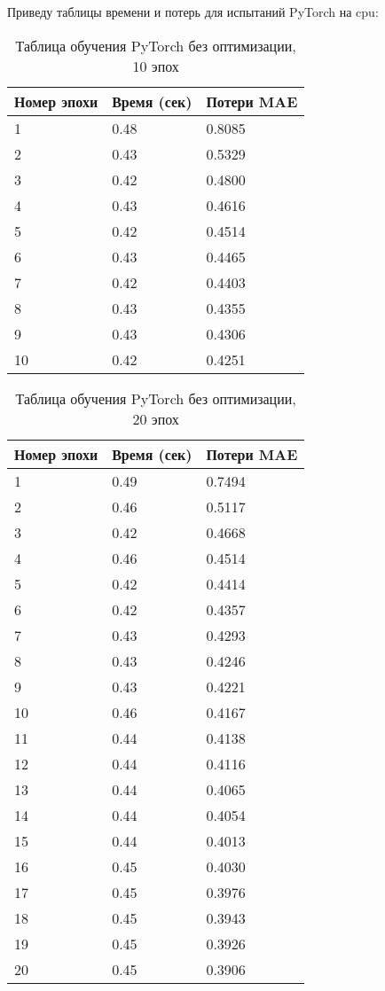 \documentclass[a4paper,12pt,titlepage,final]{article}
\begin{document}
Приведу таблицы времени и потерь для испытаний PyTorch на cpu:

\begin{table}[H]
\centering
\begin{tabular}{|p{5.4cm}|p{3.8cm}|p{3.8cm}|}
\hline
Номер эпохи & Время (сек) & Потери MAE \\
\hline
1 & 0.48 & 0.8085 \\ [1.5ex]
\hline
2 & 0.43 & 0.5329 \\ [1.5ex]
\hline
3 & 0.42 & 0.4800 \\ [1.5ex]
\hline
4 & 0.43 & 0.4616 \\ [1.5ex]
\hline
5 & 0.42 & 0.4514 \\ [1.5ex]
\hline
6 & 0.43 & 0.4465 \\ [1.5ex]
\hline
7 & 0.42 & 0.4403 \\ [1.5ex]
\hline
8 & 0.43 & 0.4355 \\ [1.5ex]
\hline
9 & 0.43 & 0.4306 \\ [1.5ex]
\hline
10 & 0.42 & 0.4251 \\ [1.5ex]
\hline
\end{tabular}
\caption{Таблица обучения PyTorch без оптимизации, 10 эпох}
\label{table7}
\end{table}

\begin{table}[H]
\centering
\begin{tabular}{|p{6.4cm}|p{3.2cm}|p{3.2cm}|}
\hline
Номер эпохи & Время (сек) & Потери MAE\\
\hline
1 & 0.49 & 0.7494 \\ [1.5ex]
\hline
2 & 0.46 & 0.5117 \\ [1.5ex]
\hline
3 & 0.42 & 0.4668 \\ [1.5ex]
\hline
4 & 0.46 & 0.4514 \\ [1.5ex]
\hline
5 & 0.42 & 0.4414 \\ [1.5ex]
\hline
6 & 0.42 & 0.4357 \\ [1.5ex]
\hline
7 & 0.43 & 0.4293 \\ [1.5ex]
\hline
8 & 0.43 & 0.4246 \\ [1.5ex]
\hline
9 & 0.43 & 0.4221 \\ [1.5ex]
\hline
10 & 0.46 & 0.4167 \\ [1.5ex]
\hline
11 & 0.44 & 0.4138 \\ [1.5ex]
\hline
12 & 0.44 & 0.4116 \\ [1.5ex]
\hline
13 & 0.44 & 0.4065 \\ [1.5ex]
\hline
14 & 0.44 & 0.4054 \\ [1.5ex]
\hline
15 & 0.44 & 0.4013 \\ [1.5ex]
\hline
16 & 0.45 & 0.4030 \\ [1.5ex]
\hline
17 & 0.45 & 0.3976 \\ [1.5ex]
\hline
18 & 0.45 & 0.3943 \\ [1.5ex]
\hline
19 & 0.45 & 0.3926 \\ [1.5ex]
\hline
20 & 0.45 & 0.3906 \\ [1.5ex]
\hline
\end{tabular}
\caption{Таблица обучения PyTorch без оптимизации, 20 эпох}
\label{table8}
\end{table}
\end{document}
